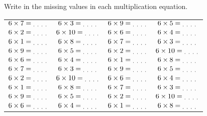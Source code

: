 \documentclass[12pt]{article}
\newcommand{\fivedots}{\textsubscript{. . . .}}
\begin{document}
Write in the missing values in each multiplication equation.
\begin{center}
\begin{tabular}{|c|c|c|c|}
\hline
$6 \times 7 = \fivedots$ & $6 \times 3 = \fivedots$ & $6 \times 9 = \fivedots$ & $6 \times 5 = \fivedots$ \\
$6 \times 2 = \fivedots$ & $6 \times 10 = \fivedots$ & $6 \times 6 = \fivedots$ & $6 \times 4 = \fivedots$ \\
$6 \times 1 = \fivedots$ & $6 \times 8 = \fivedots$ & $6 \times 7 = \fivedots$ & $6 \times 3 = \fivedots$ \\
$6 \times 9 = \fivedots$ & $6 \times 5 = \fivedots$ & $6 \times 2 = \fivedots$ & $6 \times 10 = \fivedots$ \\
$6 \times 6 = \fivedots$ & $6 \times 4 = \fivedots$ & $6 \times 1 = \fivedots$ & $6 \times 8 = \fivedots$ \\
$6 \times 7 = \fivedots$ & $6 \times 3 = \fivedots$ & $6 \times 9 = \fivedots$ & $6 \times 5 = \fivedots$ \\
$6 \times 2 = \fivedots$ & $6 \times 10 = \fivedots$ & $6 \times 6 = \fivedots$ & $6 \times 4 = \fivedots$ \\
$6 \times 1 = \fivedots$ & $6 \times 8 = \fivedots$ & $6 \times 7 = \fivedots$ & $6 \times 3 = \fivedots$ \\
$6 \times 9 = \fivedots$ & $6 \times 5 = \fivedots$ & $6 \times 2 = \fivedots$ & $6 \times 10 = \fivedots$ \\
$6 \times 6 = \fivedots$ & $6 \times 4 = \fivedots$ & $6 \times 1 = \fivedots$ & $6 \times 8 = \fivedots$ \\
\hline
\end{tabular}
\end{center}
\end{document}
